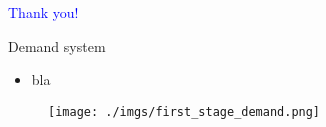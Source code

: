 \documentclass[notes,11pt, aspectratio=169]{beamer}
\begin{document}
\begin{frame}
\textcolor{blue}{\huge{\centerline{Thank you!}}}
\end{frame}

%    
%    


\appendix

\begin{frame}{Demand system}
    \vspace{0.5cm}
      \begin{itemize}
        \item  bla
      \end{itemize}
      
        \begin{figure}[t*]
          \centering
    
          \texttt{[image: ./imgs/first\_stage\_demand.png]}
        \end{figure}
        
      \end{frame}



\end{document}
